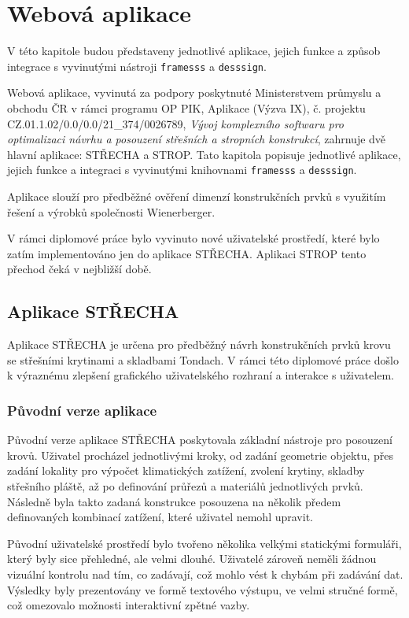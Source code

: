 \chapter{Webová aplikace}
V této kapitole budou představeny jednotlivé aplikace, jejich funkce a způsob integrace s vyvinutými nástroji \texttt{framesss} a \texttt{desssign}.

Webová aplikace, vyvinutá za podpory poskytnuté Ministerstvem průmyslu a obchodu ČR v rámci programu OP PIK, Aplikace (Výzva IX), č. projektu CZ.01.1.02/0.0/0.0/21\_374/0026789, \textit{Vývoj komplexního softwaru pro optimalizaci návrhu a posouzení střešních a stropních konstrukcí}, zahrnuje dvě hlavní aplikace: STŘECHA a STROP. Tato kapitola popisuje jednotlivé aplikace, jejich funkce a integraci s vyvinutými knihovnami \texttt{framesss} a \texttt{desssign}.

Aplikace slouží pro předběžné ověření dimenzí konstrukčních prvků s využitím řešení a výrobků společnosti Wienerberger.

V rámci diplomové práce bylo vyvinuto nové uživatelské prostředí, které bylo zatím implementováno jen do aplikace STŘECHA. Aplikaci STROP tento přechod čeká v nejbližší době.

\section{Aplikace STŘECHA}
Aplikace STŘECHA je určena pro předběžný návrh konstrukčních prvků krovu se střešními krytinami a skladbami Tondach. V rámci této diplomové práce došlo k výraznému zlepšení grafického uživatelského rozhraní a interakce s uživatelem.

\subsection{Původní verze aplikace}
Původní verze aplikace STŘECHA poskytovala základní nástroje pro posouzení krovů. Uživatel procházel jednotlivými kroky, od zadání geometrie objektu, přes zadání lokality pro výpočet klimatických zatížení, zvolení krytiny, skladby střešního pláště, až po definování průřezů a materiálů jednotlivých prvků. Následně byla takto zadaná konstrukce posouzena na několik předem definovaných kombinací zatížení, které uživatel nemohl upravit.

Původní uživatelské prostředí bylo tvořeno několika velkými statickými formuláři, který byly sice přehledné, ale velmi dlouhé. Uživatelé zároveň neměli žádnou vizuální kontrolu nad tím, co zadávají, což mohlo vést k chybám při zadávání dat. Výsledky byly prezentovány ve formě textového výstupu, ve velmi stručné formě, což omezovalo možnosti interaktivní zpětné vazby.

